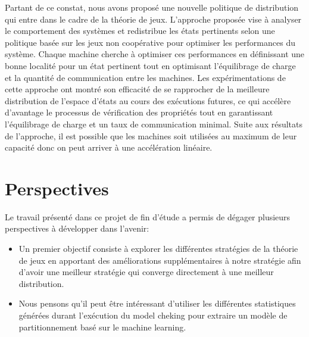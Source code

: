 Partant de ce constat, nous avons proposé une nouvelle politique de distribution qui entre dans le cadre de la théorie de jeux. L'approche proposée vise à analyser le comportement des systèmes et redistribue les états pertinents selon une politique basée sur les jeux non coopérative pour optimiser les performances du système. Chaque machine cherche à optimiser ces performances en définissant une bonne localité pour un état pertinent tout en optimisant l’équilibrage de charge et la quantité de communication entre les machines. Les expérimentations de cette approche ont montré son efficacité de se rapprocher de la meilleure distribution de l’espace d’états au cours des exécutions futures, ce qui accélère d’avantage le processus de vérification des propriétés tout en garantissant l’équilibrage de  charge et un taux de communication minimal. Suite aux résultats de l'approche, il est possible que les machines soit utilisées au maximum de leur capacité donc on peut arriver à une accélération linéaire.

\section*{Perspectives}
Le travail présenté dans ce projet de fin d'étude a permis de dégager plusieurs perspectives à développer dans l’avenir:
\begin{itemize}
	\item Un premier objectif consiste à explorer les différentes stratégies de la théorie de jeux en apportant des améliorations supplémentaires à notre stratégie afin d’avoir une meilleur stratégie qui converge directement à une meilleur distribution.
	\item Nous pensons qu’il peut être intéressant d'utiliser les différentes statistiques générées durant l'exécution du model cheking pour  extraire un modèle de partitionnement basé sur le machine learning.
\end{itemize}
